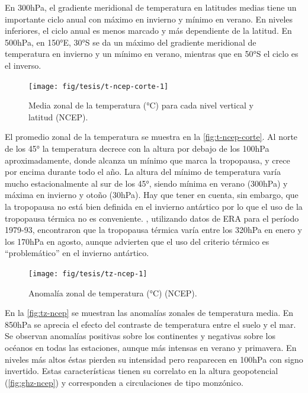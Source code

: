 \documentclass[spanish,a4paper,12pt,oneside]{book}
\begin{document}
En 300hPa, el gradiente meridional de temperatura en latitudes medias
tiene un importante ciclo anual con máximo en invierno y mínimo en
verano. En niveles inferiores, el ciclo anual es menos marcado y más
dependiente de la latitud. En 500hPa, en 150°E, 30°S se da un máximo del
gradiente meridional de temperatura en invierno y un mínimo en verano,
mientras que en 50°S el ciclo es el inverso.

\begin{figure}
\texttt{[image: fig/tesis/t-ncep-corte-1]} \caption{Media zonal de la temperatura (°C) para cada nivel vertical y latitud (NCEP).}\label{fig:t-ncep-corte}
\end{figure}

El promedio zonal de la temperatura se muestra en la
\autoref{fig:t-ncep-corte}. Al norte de los 45° la temperatura decrece
con la altura por debajo de los 100hPa aproximadamente, donde alcanza un
mínimo que marca la tropopausa, y crece por encima durante todo el año.
La altura del mínimo de temperatura varía mucho estacionalmente al sur
de los 45°, siendo mínima en verano (300hPa) y máxima en invierno y
otoño (30hPa). Hay que tener en cuenta, sin embargo, que la tropopausa
no está bien definida en el invierno antártico
\citep{Court1942, Zangl2001} por lo que el uso de la tropopausa térmica
no es conveniente. \citet{Zangl2001}, utilizando datos de ERA para el
período 1979-93, encontraron que la tropopausa térmica varía entre los
320hPa en enero y los 170hPa en agosto, aunque advierten que el uso del
criterio térmico es ``problemático'' en el invierno antártico.

\begin{landscape}\begin{figure}

{\centering \texttt{[image: fig/tesis/tz-ncep-1]} 

}

\caption{Anomalía zonal de temperatura (°C) (NCEP).}\label{fig:tz-ncep}
\end{figure}
\end{landscape}

En la \autoref{fig:tz-ncep} se muestran las anomalías zonales de
temperatura media. En 850hPa se aprecia el efecto del contraste de
temperatura entre el suelo y el mar. Se observan anomalías positivas
sobre los continentes y negativas sobre los océanos en todas las
estaciones, aunque más intensas en verano y primavera. En niveles más
altos éstas pierden su intensidad pero reaparecen en 100hPa con signo
invertido. Estas características tienen su correlato en la altura
geopotencial (\autoref{fig:ghz-ncep}) y corresponden a circulaciones de
tipo monzónico.
\end{document}
